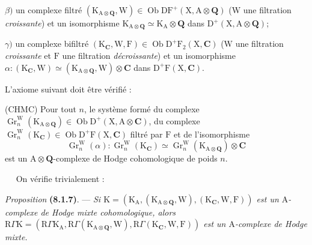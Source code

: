 \documentclass[11pt,leqno]{article}
\newcommand{\Page}[1]{\ifvmode\noindent\else\unskip\ \fi{\footnotesize\textcolor{gray}{[p.\,#1]}}\ \ignorespaces}
\begin{document}
\(\beta)\) un complexe filtré \((\mathrm{K}_{\mathrm{A}\otimes\mathbf{Q}},\mathrm{W})\in\operatorname{Ob}\mathrm{DF}^{+}(\mathrm{X},\mathrm{A}\otimes\mathbf{Q})\) (\(\mathrm{W}\) une filtration \textit{croissante}) et un isomorphisme \(\mathrm{K}_{\mathrm{A}\otimes\mathbf{Q}}\simeq\mathrm{K}_{\mathrm{A}}\otimes\mathbf{Q}\) dans \(\mathrm{D}^{+}(\mathrm{X},\mathrm{A}\otimes\mathbf{Q})\);

\(\gamma)\) un complexe bifiltré \((\mathrm{K}_{\mathbf{C}},\mathrm{W},\mathrm{F})\in\operatorname{Ob}\mathrm{D}^{+}\mathrm{F}_{2}(\mathrm{X},\mathbf{C})\) (\(\mathrm{W}\) une filtration \textit{croissante} et \(\mathrm{F}\) une filtration \textit{décroissante}) et un isomorphisme \(\alpha:(\mathrm{K}_{\mathbf{C}},\mathrm{W})\simeq(\mathrm{K}_{\mathrm{A}\otimes\mathbf{Q}},\mathrm{W})\otimes\mathbf{C}\) dans \(\mathrm{D}^{+}\mathrm{F}(\mathrm{X},\mathbf{C})\).

L’axiome suivant doit être vérifié :

(CHMC) Pour tout \(n\), le système formé du complexe \(\operatorname{Gr}_{n}^{\mathrm{W}}(\mathrm{K}_{\mathrm{A}\otimes\mathbf{Q}})\in\operatorname{Ob}\mathrm{D}^{+}(\mathrm{X},\mathrm{A}\otimes\mathbf{C})\), du complexe \(\operatorname{Gr}_{n}^{\mathrm{W}}(\mathrm{K}_{\mathbf{C}})\in\operatorname{Ob}\mathrm{D}^{+}\mathrm{F}(\mathrm{X},\mathbf{C})\) filtré par \(\mathrm{F}\) et de l’isomorphisme
\[
\operatorname{Gr}_{n}^{\mathrm{W}}(\alpha):
\operatorname{Gr}_{n}^{\mathrm{W}}(\mathrm{K}_{\mathbf{C}})
\simeq
\operatorname{Gr}_{n}^{\mathrm{W}}(\mathrm{K}_{\mathrm{A}\otimes\mathbf{Q}})\otimes\mathbf{C}
\]
est un \(\mathrm{A}\otimes\mathbf{Q}\)-complexe de Hodge cohomologique de poids \(n\).

\Page{30}
On vérifie trivialement :

\textit{Proposition} \textbf{(8.1.7)}. — \textit{Si \(\mathrm{K}=(\mathrm{K}_{\mathrm{A}},(\mathrm{K}_{\mathrm{A}\otimes\mathbf{Q}},\mathrm{W}),(\mathrm{K}_{\mathbf{C}},\mathrm{W},\mathrm{F}))\) est un \(\mathrm{A}\)-complexe de Hodge mixte cohomologique, alors \(\mathrm{R}\Gamma\mathrm{K}=(\mathrm{R}\Gamma\mathrm{K}_{\mathrm{A}},\mathrm{R}\Gamma(\mathrm{K}_{\mathrm{A}\otimes\mathbf{Q}},\mathrm{W}),\mathrm{R}\Gamma(\mathrm{K}_{\mathbf{C}},\mathrm{W},\mathrm{F}))\) est un \(\mathrm{A}\)-complexe de Hodge mixte.}
\end{document}
